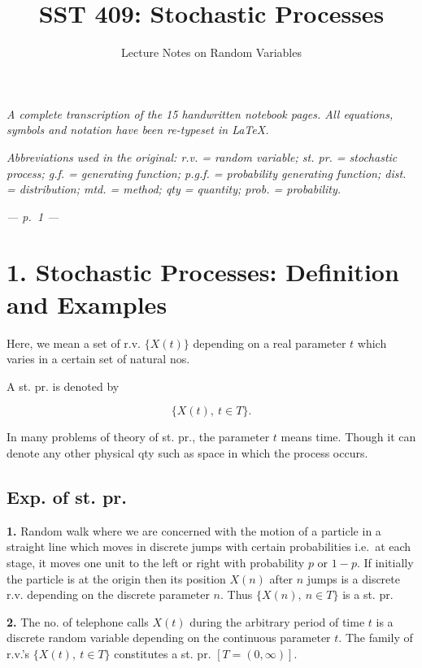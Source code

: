 \documentclass[
]{article}
\title{SST 409: Stochastic Processes}
\subtitle{Lecture Notes on Random Variables}
\author{}
\date{}
\begin{document}
\maketitle

{
\setcounter{tocdepth}{2}
\tableofcontents
}
\emph{A complete transcription of the 15 handwritten notebook pages. All
equations, symbols and notation have been re-typeset in LaTeX.}

\emph{Abbreviations used in the original: r.v. = random variable; st.
pr. = stochastic process; g.f. = generating function; p.g.f. =
probability generating function; dist. = distribution; mtd. = method;
qty = quantity; prob. = probability.}

\emph{--- p.~1 ---}

\section{1. Stochastic Processes: Definition and
Examples}\label{stochastic-processes-definition-and-examples}

Here, we mean a set of r.v. \(\{X(t)\}\) depending on a real parameter
\(t\) which varies in a certain set of natural nos.

A st. pr. is denoted by

\[\{X(t),\ t \in T\}.\]

In many problems of theory of st. pr., the parameter \(t\) means time.
Though it can denote any other physical qty such as space in which the
process occurs.

\subsection{Exp. of st. pr.}\label{exp.-of-st.-pr.}

\textbf{1.} Random walk where we are concerned with the motion of a
particle in a straight line which moves in discrete jumps with certain
probabilities i.e.~at each stage, it moves one unit to the left or right
with probability \(p\) or \(1-p\). If initially the particle is at the
origin then its position \(X(n)\) after \(n\) jumps is a discrete r.v.
depending on the discrete parameter \(n\). Thus \(\{X(n),\ n \in T\}\)
is a st. pr.

\textbf{2.} The no. of telephone calls \(X(t)\) during the arbitrary
period of time \(t\) is a discrete random variable depending on the
continuous parameter \(t\). The family of r.v.'s \(\{X(t),\ t \in T\}\)
constitutes a st. pr. \(\left[T = (0, \infty)\right]\).
\end{document}
